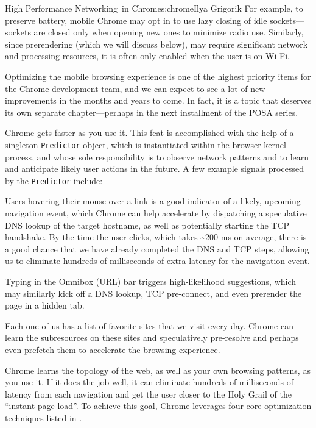 \begin{aosachapter}{High Performance Networking~in Chrome}{s:chrome}{Ilya Grigorik}
For example, to preserve battery, mobile Chrome may opt in to use lazy
closing of idle sockets---sockets are closed only when opening new ones
to minimize radio use. Similarly, since prerendering (which we will
discuss below), may require significant network and processing
resources, it is often only enabled when the user is on Wi-Fi.

Optimizing the mobile browsing experience is one of the highest priority
items for the Chrome development team, and we can expect to see a lot of
new improvements in the months and years to come. In fact, it is a topic
that deserves its own separate chapter---perhaps in the next installment
of the POSA series.


Chrome gets faster as you use it. This feat is accomplished with the
help of a singleton \texttt{Predictor} object, which is instantiated
within the browser kernel process, and whose sole responsibility is to
observe network patterns and to learn and anticipate likely user actions
in the future. A few example signals processed by the \texttt{Predictor}
include:

\begin{aosaitemize}

\item
  Users hovering their mouse over a link is a good indicator of a
  likely, upcoming navigation event, which Chrome can help accelerate by
  dispatching a speculative DNS lookup of the target hostname, as well
  as potentially starting the TCP handshake. By the time the user
  clicks, which takes \textasciitilde{}200 ms on average, there is a
  good chance that we have already completed the DNS and TCP steps,
  allowing us to eliminate hundreds of milliseconds of extra latency for
  the navigation event.
\item
  Typing in the Omnibox (URL) bar triggers high-likelihood suggestions,
  which may similarly kick off a DNS lookup, TCP pre-connect, and even
  prerender the page in a hidden tab.
\item
  Each one of us has a list of favorite sites that we visit every day.
  Chrome can learn the subresources on these sites and speculatively
  pre-resolve and perhaps even prefetch them to accelerate the browsing
  experience.
\end{aosaitemize}

Chrome learns the topology of the web, as well as your own browsing
patterns, as you use it. If it does the job well, it can eliminate
hundreds of milliseconds of latency from each navigation and get the
user closer to the Holy Grail of the ``instant page load''. To achieve
this goal, Chrome leverages four core optimization techniques listed in
.


\end{aosachapter}
